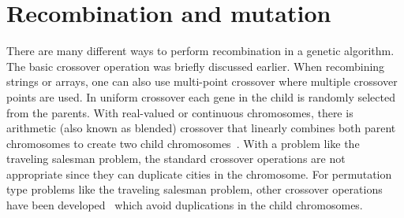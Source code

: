 \section{Recombination and mutation} \label{2-recombination}

There are many different ways to perform recombination in a genetic algorithm.
The basic crossover operation was briefly discussed earlier. When recombining
strings or arrays, one can also use multi-point crossover where multiple
crossover points are used. In uniform crossover each gene in the child is
randomly selected from the parents. With real-valued or continuous chromosomes,
there is arithmetic (also known as blended) crossover that linearly combines
both parent chromosomes to create two child
chromosomes~\cite{haupt2004practical}. With a problem like the traveling
salesman problem, the standard crossover operations are not appropriate since
they can duplicate cities in the chromosome. For permutation type problems like
the traveling salesman problem, other crossover operations have been
developed~\cite{goldberg1989genetic} which avoid duplications in the child
chromosomes. 
